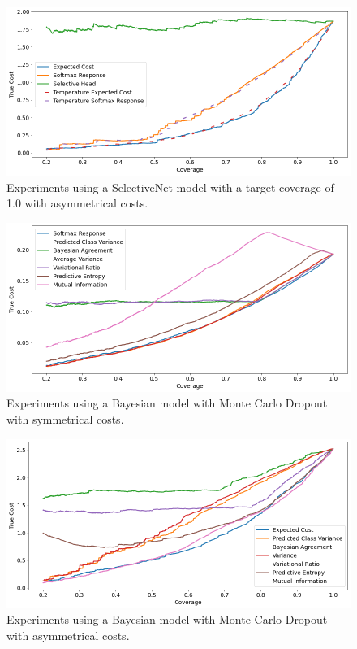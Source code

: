 \begin{figure}[h]
	\includegraphics[width=\textwidth]{images/multi-class/sn1.0-asym.png}
	\caption*{Experiments using a SelectiveNet model with a target coverage of 1.0 with asymmetrical costs.}
\end{figure}

\begin{figure}[h]
	\includegraphics[width=\textwidth]{images/multi-class/mc-dropout-sym.png}
	\caption*{Experiments using a Bayesian model with Monte Carlo Dropout with symmetrical costs.}
\end{figure}

\begin{figure}[h]
	\includegraphics[width=\textwidth]{images/multi-class/mc-dropout-asym.png}
	\caption*{Experiments using a Bayesian model with Monte Carlo Dropout with asymmetrical costs.}
\end{figure}

